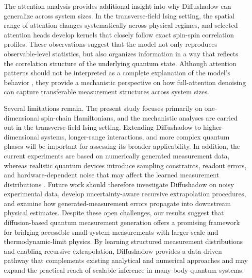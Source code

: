 \documentclass[pdflatex,sn-mathphys-num]{sn-jnl}%
\theoremstyle{thmstyleone}%
\theoremstyle{thmstyletwo}%
\theoremstyle{thmstylethree}%
\begin{document}
The attention analysis provides additional insight into why Diffushadow can generalize across system sizes. In the transverse-field Ising setting, the spatial range of attention changes systematically across physical regimes, and selected attention heads develop kernels that closely follow exact spin-spin correlation profiles. These observations suggest that the model not only reproduces observable-level statistics, but also organizes information in a way that reflects the correlation structure of the underlying quantum state. Although attention patterns should not be interpreted as a complete explanation of the model's behavior \cite{jain2019attention}, they provide a mechanistic perspective on how full-attention denoising can capture transferable measurement structures across system sizes.

Several limitations remain. The present study focuses primarily on one-dimensional spin-chain Hamiltonians, and the mechanistic analyses are carried out in the transverse-field Ising setting. Extending Diffushadow to higher-dimensional systems, longer-range interactions, and more complex quantum phases will be important for assessing its broader applicability. In addition, the current experiments are based on numerically generated measurement data, whereas realistic quantum devices introduce sampling constraints, readout errors, and hardware-dependent noise that may affect the learned measurement distributions \cite{maciejewski2020mitigation, kim2022quantum}. Future work should therefore investigate Diffushadow on noisy experimental data, develop uncertainty-aware recursive extrapolation procedures, and examine how generated-measurement errors propagate into downstream physical estimates. Despite these open challenges, our results suggest that diffusion-based quantum measurement generation offers a promising framework for bridging accessible small-system measurements with larger-scale and thermodynamic-limit physics. By learning structured measurement distributions and enabling recursive extrapolation, Diffushadow provides a data-driven pathway that complements existing analytical and numerical approaches and may expand the practical reach of scalable inference in many-body quantum systems.





\end{document}
